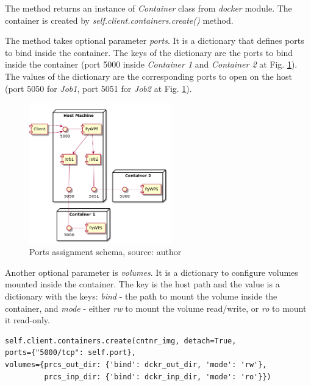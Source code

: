 The method returns an instance of \textit{Container} class from \textit{docker} module. The container is created by
\textit{self.client.containers.create()} method. 

The method takes optional parameter \textit{ports}. It is a dictionary
that defines ports to bind inside the container. The keys of the
dictionary are the ports to bind inside the container (port 5000
inside \textit{Container 1} and \textit{Container 2} at
Fig. \ref{fig:Diag_port}). The values of the dictionary are the
corresponding ports to open on the host (port 5050 for \textit{Job1},
port 5051 for \textit{Job2} at Fig. \ref{fig:Diag_port}).

\begin{figure}[h!]
\centering
\includegraphics[width=0.55\textwidth]{img/Diag_ports.png}
\caption{Ports assignment schema, source: author}
\label{fig:Diag_port}
\end{figure}

Another optional parameter is \textit{volumes}. It is a dictionary 
to configure volumes mounted inside the container. The key is the host path and the value is a dictionary with the keys: \textit{bind}
- the path to mount the volume inside the container, and \textit{mode} - either \textit{rw} to mount the volume read/write, or 
\textit{ro} to mount it read-only.

\bigskip
\begin{lstlisting}[basicstyle=\small,caption={\textit{create()} method}]
self.client.containers.create(cntnr_img, detach=True,
ports={"5000/tcp": self.port}, 
volumes={prcs_out_dir: {'bind': dckr_out_dir, 'mode': 'rw'},
         prcs_inp_dir: {'bind': dckr_inp_dir, 'mode': 'ro'}})
\end{lstlisting}

